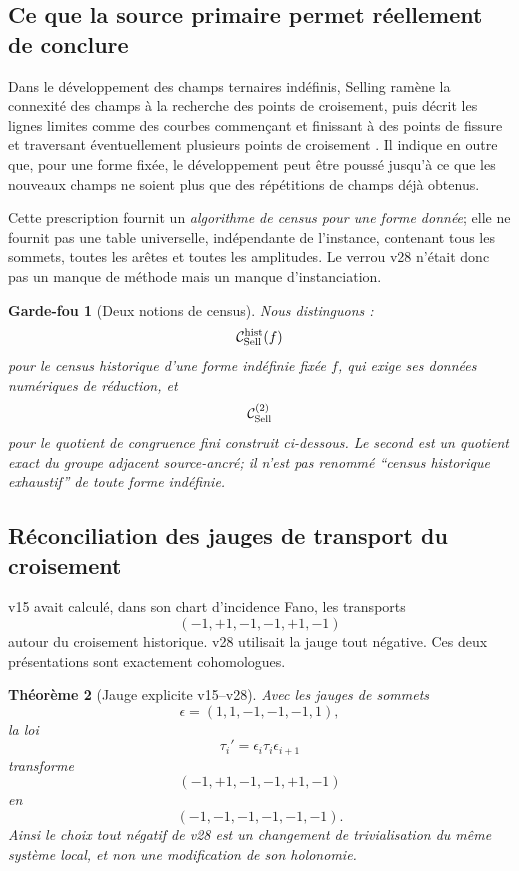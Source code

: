 \documentclass[11pt,a4paper]{article}
\newtheorem{theorem}{Théorème}[section]
\newtheorem{guardrail}[theorem]{Garde-fou}
\begin{document}
\subsection{Ce que la source primaire permet réellement de conclure}

Dans le développement des champs ternaires indéfinis, Selling ramène la connexité des champs à la recherche des points de croisement, puis décrit les lignes limites comme des courbes commençant et finissant à des points de fissure et traversant éventuellement plusieurs points de croisement \cite{Selling1877}. Il indique en outre que, pour une forme fixée, le développement peut être poussé jusqu'à ce que les nouveaux champs ne soient plus que des répétitions de champs déjà obtenus.

Cette prescription fournit un \emph{algorithme de census pour une forme donnée}; elle ne fournit pas une table universelle, indépendante de l'instance, contenant tous les sommets, toutes les arêtes et toutes les amplitudes. Le verrou v28 n'était donc pas un manque de méthode mais un manque d'instanciation.

\begin{guardrail}[Deux notions de census]
Nous distinguons :
\[
 \mathcal C_{\rm Sell}^{\rm hist}(f)
\]
pour le census historique d'une forme indéfinie fixée $f$, qui exige ses données numériques de réduction, et
\[
 \mathcal C_{\rm Sell}^{(2)}
\]
pour le quotient de congruence fini construit ci-dessous. Le second est un quotient exact du groupe adjacent source-ancré; il n'est pas renommé ``census historique exhaustif'' de toute forme indéfinie.
\end{guardrail}

\subsection{Réconciliation des jauges de transport du croisement}

v15 avait calculé, dans son chart d'incidence Fano, les transports
\[
 (-1,+1,-1,-1,+1,-1)
\]
autour du croisement historique. v28 utilisait la jauge tout négative. Ces deux présentations sont exactement cohomologues.

\begin{theorem}[Jauge explicite v15--v28]\label{thm:v29-tau-gauge}
Avec les jauges de sommets
\[
 \epsilon=(1,1,-1,-1,-1,1),
\]
la loi
\[
 \tau_i'
 =
 \epsilon_i\tau_i\epsilon_{i+1}
\]
transforme
\[
 (-1,+1,-1,-1,+1,-1)
\]
en
\[
 \boxed{(-1,-1,-1,-1,-1,-1).}
\]
Ainsi le choix tout négatif de v28 est un changement de trivialisation du même système local, et non une modification de son holonomie.
\end{theorem}
\end{document}

